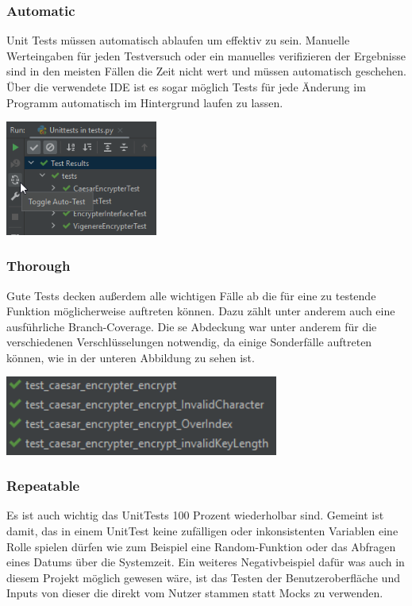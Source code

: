 \documentclass[12pt]{article}
\begin{document}
\subsubsection{Automatic}
Unit Tests müssen automatisch ablaufen um effektiv zu sein. Manuelle Werteingaben für jeden Testversuch oder ein manuelles verifizieren der Ergebnisse sind in den meisten Fällen die Zeit nicht wert und müssen automatisch geschehen. Über die verwendete IDE ist es sogar möglich Tests für jede Änderung im Programm automatisch im Hintergrund laufen zu lassen.
\begin{center}
	\includegraphics[width=5cm]{bilder/Automatic.png}
\end{center}
\subsubsection{Thorough}
Gute Tests decken außerdem alle wichtigen Fälle ab die für eine zu testende Funktion möglicherweise auftreten können. Dazu zählt unter anderem auch eine ausführliche Branch-Coverage. Die se Abdeckung war unter anderem für die verschiedenen Verschlüsselungen notwendig, da einige Sonderfälle auftreten können, wie in der unteren Abbildung zu sehen ist.
\begin{center}
	\includegraphics[width=9cm]{bilder/Thorough.png}
\end{center}

\subsubsection{Repeatable}
Es ist auch wichtig das UnitTests 100 Prozent wiederholbar sind. Gemeint ist damit, das in einem UnitTest keine zufälligen oder inkonsistenten Variablen eine Rolle spielen dürfen wie zum Beispiel eine Random-Funktion oder das Abfragen eines Datums über die Systemzeit. Ein weiteres Negativbeispiel dafür was auch in diesem Projekt möglich gewesen wäre, ist das Testen der Benutzeroberfläche und Inputs von dieser die  direkt vom Nutzer stammen statt Mocks zu verwenden.
\end{document}
